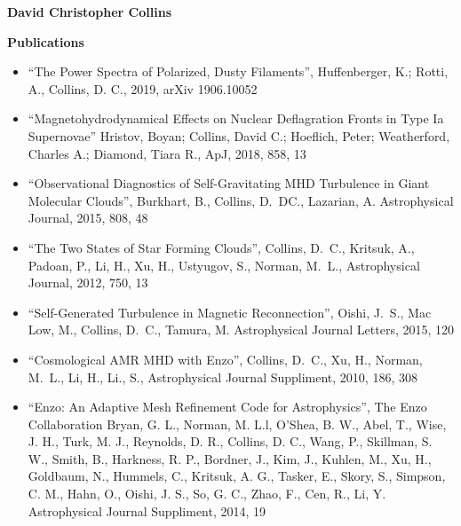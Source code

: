 \documentclass[11pt]{article}
\begin{document}
\noindent 
{\bf\large David Christopher Collins}

\medskip


\medskip

\noindent
\textbf{Publications}
\vspace{-4mm}

\begin{itemize}

    \item ``The Power Spectra of Polarized, Dusty Filaments'', Huffenberger, K.; Rotti,
A., Collins, D. C., 2019, arXiv 1906.10052

\item
``Magnetohydrodynamical Effects on Nuclear Deflagration Fronts in Type Ia Supernovae''
Hristov, Boyan; Collins, David C.; Hoeflich, Peter; Weatherford, Charles A.; Diamond, Tiara R., 
ApJ, 2018, 858, 13

\item ``Observational Diagnostics of Self-Gravitating MHD Turbulence in Giant
Molecular Clouds'', {Burkhart}, B., {Collins}, D.~DC., {Lazarian}, A.
Astrophysical Journal, 2015, 808, 48



\item 
``The Two States of Star Forming Clouds'', 
Collins, D.~C., Kritsuk, A., Padoan, P., Li, H., Xu, H., Ustyugov, S., Norman, M.~L.,
Astrophysical Journal, 2012, 750, 13

\item ``Self-Generated Turbulence in Magnetic Reconnection'', {Oishi}, J.~S.,
{Mac
Low}, M., {Collins}, D.~C., Tamura, M.  Astrophysical Journal Letters,
2015, 120


\item ``Cosmological AMR MHD with Enzo'', 
Collins, D.~C., Xu, H., Norman, M.~L., Li, H., Li., S.,
Astrophysical Journal Suppliment, 2010, 186, 308


  \item ``Enzo: An Adaptive Mesh Refinement Code for Astrophysics'', The Enzo
Collaboration 
Bryan, G. L., Norman, M. L.l, O’Shea, B. W.,  Abel, T.,  Wise, J. H.,
Turk, M. J., 
Reynolds, D. R.,
Collins, D. C.,
Wang, P., Skillman, S. W., Smith, B., Harkness, R. P., Bordner, J.,
Kim, J., Kuhlen, M., Xu, H.,
Goldbaum, N., Hummels, C., Kritsuk, A. G., Tasker, E., 
Skory, S., Simpson, C. M., Hahn, O., Oishi, J. S., So, G. C.,
Zhao, F., Cen, R., Li, Y.
Astrophysical Journal Suppliment, 2014,  19


\end{itemize}
\end{document}
